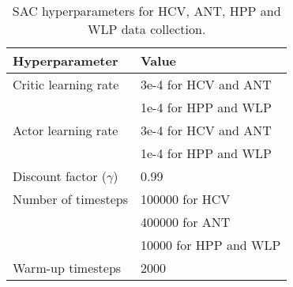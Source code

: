 
\begin{table}[ht]
\centering
\caption{SAC hyperparameters for HCV, ANT, HPP and WLP data collection.}
\begin{tabular}{l|l}
\toprule
Hyperparameter & Value \\
\midrule
Critic learning rate & 3e-4 for HCV and ANT \\
& 1e-4 for HPP and WLP \\
Actor learning rate & 3e-4 for HCV and ANT \\
& 1e-4 for HPP and WLP \\
Discount factor ($\gamma$) & 0.99\\
Number of timesteps & 100000 for HCV\\
& 400000 for ANT\\
& 10000 for HPP and WLP\\
Warm-up timesteps & 2000\\
\bottomrule
\end{tabular}
\label{tab:sac_params}
\end{table}
